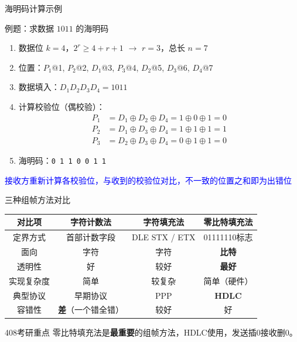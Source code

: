 \documentclass[10pt, aspectratio=169]{beamer}
\begin{document}
\begin{frame}{海明码计算示例}
    \begin{exampleblock}{例题：求数据 $1011$ 的海明码}
        \begin{enumerate}
            \item 数据位 $k=4$，$2^r \ge 4+r+1$ $\to$ $r=3$，总长 $n=7$
            \item 位置：$P_1$@1, $P_2$@2, $D_1$@3, $P_3$@4, $D_2$@5, $D_3$@6, $D_4$@7
            \item 数据填入：$D_1D_2D_3D_4 = 1011$
            \item 计算校验位（偶校验）：
            \begin{align*}
                P_1 &= D_1 \oplus D_2 \oplus D_4 = 1 \oplus 0 \oplus 1 = 0 \\
                P_2 &= D_1 \oplus D_3 \oplus D_4 = 1 \oplus 1 \oplus 1 = 1 \\
                P_3 &= D_2 \oplus D_3 \oplus D_4 = 0 \oplus 1 \oplus 1 = 0
            \end{align*}
            \item 海明码：\texttt{0 1 1 0 0 1 1}
        \end{enumerate}
    \end{exampleblock}
    \vspace{0.3em}
    \begin{center}
        \textcolor{blue}{接收方重新计算各校验位，与收到的校验位对比，不一致的位置之和即为出错位}
    \end{center}
\end{frame}

\begin{frame}{三种组帧方法对比}
    \begin{table}
        \begin{tabular}{|c|c|c|c|}
            \hline
            \textbf{对比项} & \textbf{字符计数法} & \textbf{字符填充法} & \textbf{零比特填充法} \\ \hline
            定界方式 & 首部计数字段 & DLE STX / ETX & 01111110标志 \\
            面向 & 字符 & 字符 & \textbf{比特} \\
            透明性 & 好 & 较好 & \textbf{最好} \\
            实现复杂度 & 简单 & 较复杂 & 简单（硬件） \\
            典型协议 & 早期协议 & PPP & \textbf{HDLC} \\
            容错性 & \textbf{差}（一个错全错） & 较好 & 好 \\
            \hline
        \end{tabular}
    \end{table}
    \vspace{0.5em}
    \begin{block}{408考研重点}
        零比特填充法是\textbf{最重要}的组帧方法，HDLC使用，发送插0接收删0。
    \end{block}
\end{frame}
\end{document}
